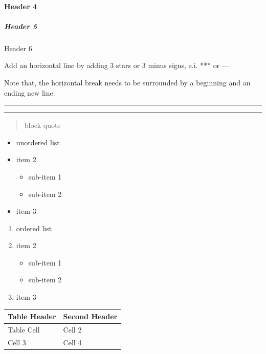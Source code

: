 \documentclass[]{article}
\providecommand{\tightlist}{%
  \setlength{\itemsep}{0pt}\setlength{\parskip}{0pt}}
\let\oldparagraph\paragraph
\renewcommand{\paragraph}[1]{\oldparagraph{#1}\mbox{}}
\let\oldsubparagraph\subparagraph
\renewcommand{\subparagraph}[1]{\oldsubparagraph{#1}\mbox{}}
\begin{document}
\hypertarget{header-4}{%
\paragraph{Header 4}\label{header-4}}

\hypertarget{header-5}{%
\subparagraph{Header 5}\label{header-5}}

Header 6

Add an horizontal line by adding 3 stars or 3 minus signs, e.i. *** or
---

Note that, the horizontal break needs to be surrounded by a beginning
and an ending new line.

\begin{center}\rule{0.5\linewidth}{\linethickness}\end{center}

\begin{center}\rule{0.5\linewidth}{\linethickness}\end{center}

\begin{quote}
block quote
\end{quote}

\begin{itemize}
\tightlist
\item
  unordered list
\item
  item 2

  \begin{itemize}
  \tightlist
  \item
    sub-item 1
  \item
    sub-item 2
  \end{itemize}
\item
  item 3
\end{itemize}

\begin{enumerate}
\def\labelenumi{\arabic{enumi}.}
\tightlist
\item
  ordered list
\item
  item 2

  \begin{itemize}
  \tightlist
  \item
    sub-item 1
  \item
    sub-item 2
  \end{itemize}
\item
  item 3
\end{enumerate}

\begin{longtable}[]{@{}ll@{}}
\toprule
Table Header & Second Header\tabularnewline
\midrule
\endhead
Table Cell & Cell 2\tabularnewline
Cell 3 & Cell 4\tabularnewline
\bottomrule
\end{longtable}
\end{document}
